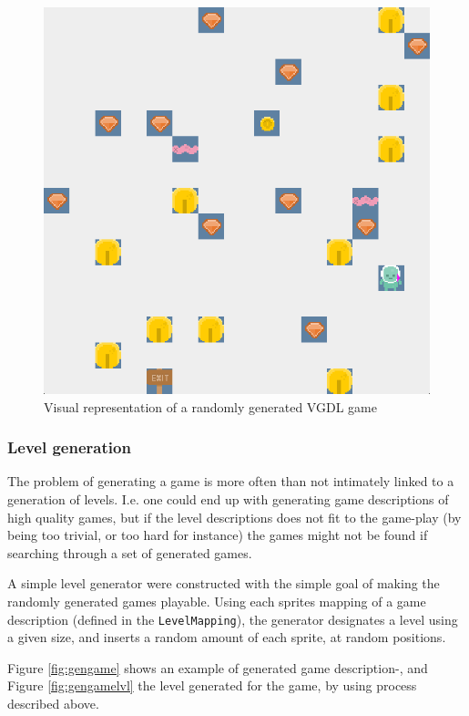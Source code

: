 \documentclass[a4paper,titlepage,final]{report}
\begin{document}
\begin{figure}[!ht]
\centering
\includegraphics[scale=0.24]{rndgengame.png}
\caption{Visual representation of a randomly generated VGDL game}
\label{fig:gengamescreenshot}
\end{figure}

\subsubsection*{Level generation}
The problem of generating a game is more often than not intimately linked to a generation of levels.
I.e. one could end up with generating game descriptions of high quality games, but if the level descriptions does not fit to the game-play (by being too trivial, or too hard for instance) the games might not be found if searching through a set of generated games.

A simple level generator were constructed with the simple goal of making the randomly generated games playable.
Using each sprites mapping of a game description (defined in the \texttt{LevelMapping}), the generator designates a level using a given size, and inserts a random amount of each sprite, at random positions.

Figure \ref{fig:gengame} shows an example of generated game description-, and Figure \ref{fig:gengamelvl} the level generated for the game, by using process described above.
\end{document}
